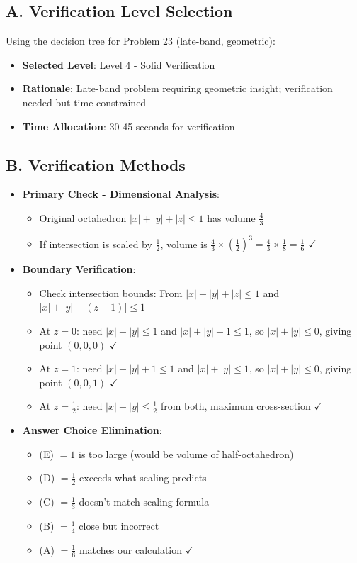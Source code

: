 \documentclass[11pt]{article}
\begin{document}
\begin{verificationbox}
\subsection*{A. Verification Level Selection}
Using the decision tree for Problem 23 (late-band, geometric):
\begin{itemize}[leftmargin=*]
    \item \textbf{Selected Level}: Level 4 - Solid Verification
    \item \textbf{Rationale}: Late-band problem requiring geometric insight; verification needed but time-constrained
    \item \textbf{Time Allocation}: 30-45 seconds for verification
\end{itemize}

\subsection*{B. Verification Methods}
\begin{itemize}[leftmargin=*]
    \item \textbf{Primary Check - Dimensional Analysis}:
    \begin{itemize}
        \item Original octahedron $|x|+|y|+|z|\le1$ has volume $\frac{4}{3}$
        \item If intersection is scaled by $\frac{1}{2}$, volume is $\frac{4}{3} \times (\frac{1}{2})^3 = \frac{4}{3} \times \frac{1}{8} = \frac{1}{6}$ $\checkmark$
    \end{itemize}
    \item \textbf{Boundary Verification}:
    \begin{itemize}
        \item Check intersection bounds: From $|x|+|y|+|z|\le1$ and $|x|+|y|+(z-1)|\le1$
        \item At $z=0$: need $|x|+|y|\le1$ and $|x|+|y|+1\le1$, so $|x|+|y|\le0$, giving point $(0,0,0)$ $\checkmark$
        \item At $z=1$: need $|x|+|y|+1\le1$ and $|x|+|y|\le1$, so $|x|+|y|\le0$, giving point $(0,0,1)$ $\checkmark$
        \item At $z=\frac{1}{2}$: need $|x|+|y|\le\frac{1}{2}$ from both, maximum cross-section $\checkmark$
    \end{itemize}
    \item \textbf{Answer Choice Elimination}:
    \begin{itemize}
        \item (E) $=1$ is too large (would be volume of half-octahedron)
        \item (D) $=\frac{1}{2}$ exceeds what scaling predicts
        \item (C) $=\frac{1}{3}$ doesn't match scaling formula
        \item (B) $=\frac{1}{4}$ close but incorrect
        \item (A) $=\frac{1}{6}$ matches our calculation $\checkmark$
    \end{itemize}
\end{itemize}


\end{verificationbox}
\end{document}
